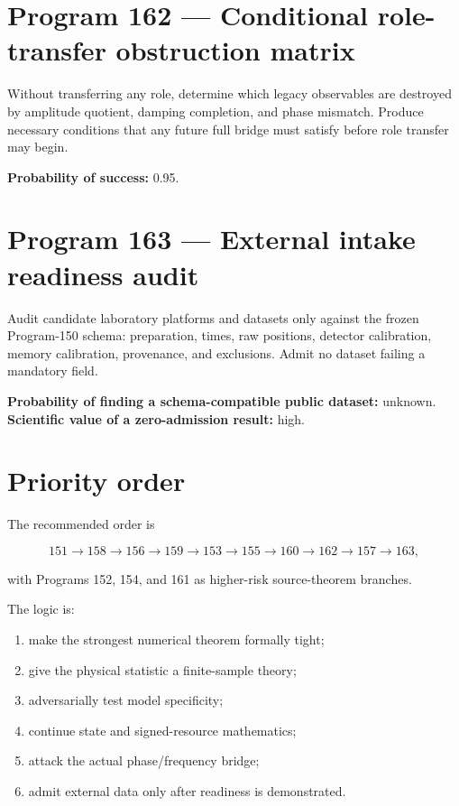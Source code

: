 \documentclass[11pt,a4paper,openany]{report}
\begin{document}
\section{Program 162 --- Conditional role-transfer obstruction matrix}

Without transferring any role, determine which legacy observables are destroyed by amplitude quotient, damping completion, and phase mismatch. Produce necessary conditions that any future full bridge must satisfy before role transfer may begin.

\textbf{Probability of success:} 0.95.

\section{Program 163 --- External intake readiness audit}

Audit candidate laboratory platforms and datasets only against the frozen Program-150 schema: preparation, times, raw positions, detector calibration, memory calibration, provenance, and exclusions. Admit no dataset failing a mandatory field.

\textbf{Probability of finding a schema-compatible public dataset:} unknown.\\
\textbf{Scientific value of a zero-admission result:} high.

\section{Priority order}

The recommended order is

\[
151\to158\to156\to159\to153\to155\to160\to162\to157\to163,
\]

with Programs 152, 154, and 161 as higher-risk source-theorem branches.

The logic is:

\begin{enumerate}
\item 
make the strongest numerical theorem formally tight;

\item 
give the physical statistic a finite-sample theory;

\item 
adversarially test model specificity;

\item 
continue state and signed-resource mathematics;

\item 
attack the actual phase/\allowbreak{}frequency bridge;

\item 
admit external data only after readiness is demonstrated.

\end{enumerate}
\end{document}

